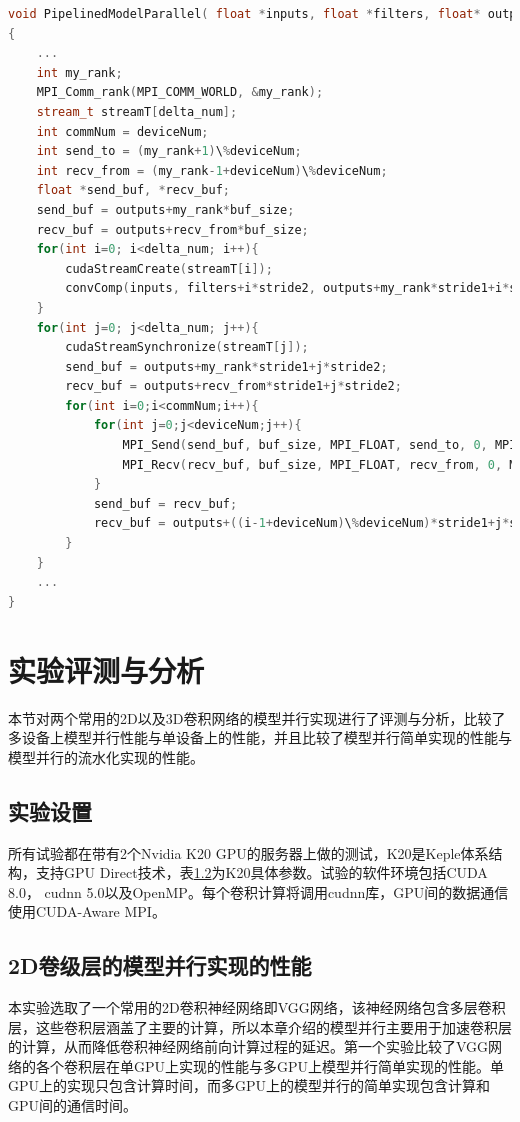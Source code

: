 \begin{table}
\caption{模型并行流水化的代码实现}
\label{OverlapA}
\begin{lstlisting}[language=C++, basicstyle=\ttfamily\footnotesize]
void PipelinedModelParallel( float *inputs, float *filters, float* outputs,  int delta_num, int buf_size, int deviceNum, int stride1, int stride2... )
{
	...
	int my_rank;
	MPI_Comm_rank(MPI_COMM_WORLD, &my_rank);
	stream_t streamT[delta_num];
	int commNum = deviceNum;
	int send_to = (my_rank+1)\%deviceNum;
	int recv_from = (my_rank-1+deviceNum)\%deviceNum;
	float *send_buf, *recv_buf;
	send_buf = outputs+my_rank*buf_size;
	recv_buf = outputs+recv_from*buf_size;
	for(int i=0; i<delta_num; i++){
		cudaStreamCreate(streamT[i]);
		convComp(inputs, filters+i*stride2, outputs+my_rank*stride1+i*stride2, streamT[i]);
	}
	for(int j=0; j<delta_num; j++){
		cudaStreamSynchronize(streamT[j]);
		send_buf = outputs+my_rank*stride1+j*stride2;
		recv_buf = outputs+recv_from*stride1+j*stride2;
		for(int i=0;i<commNum;i++){	
			for(int j=0;j<deviceNum;j++){
				MPI_Send(send_buf, buf_size, MPI_FLOAT, send_to, 0, MPI_COMM_WORLD);
				MPI_Recv(recv_buf, buf_size, MPI_FLOAT, recv_from, 0, MPI_COMM_WORLD);
			}
			send_buf = recv_buf;
			recv_buf = outputs+((i-1+deviceNum)\%deviceNum)*stride1+j*stride2;
		}
	}
	...
}
\end{lstlisting}
\end{table}

\section{实验评测与分析}
本节对两个常用的2D以及3D卷积网络的模型并行实现进行了评测与分析，比较了多设备上模型并行性能与单设备上的性能，并且比较了模型并行简单实现的性能与模型并行的流水化实现的性能。

\subsection{实验设置}
所有试验都在带有2个Nvidia K20 GPU的服务器上做的测试，K20是Keple体系结构，支持GPU Direct技术，表\ref{}为K20具体参数。试验的软件环境包括CUDA 8.0， cudnn 5.0以及OpenMP。每个卷积计算将调用cudnn库，GPU间的数据通信使用CUDA-Aware MPI。

\subsection{2D卷级层的模型并行实现的性能}
本实验选取了一个常用的2D卷积神经网络即VGG网络，该神经网络包含多层卷积层，这些卷积层涵盖了主要的计算，所以本章介绍的模型并行主要用于加速卷积层的计算，从而降低卷积神经网络前向计算过程的延迟。第一个实验比较了VGG网络的各个卷积层在单GPU上实现的性能与多GPU上模型并行简单实现的性能。单GPU上的实现只包含计算时间，而多GPU上的模型并行的简单实现包含计算和GPU间的通信时间。


